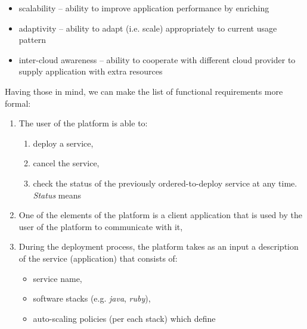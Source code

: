 \begin{itemize}
	\item scalability           -- ability to improve application performance by enriching
	\item adaptivity            -- ability to adapt (i.e. scale) appropriately to current usage pattern
	\item inter-cloud awareness -- ability to cooperate with different cloud provider to supply application with extra resources
\end{itemize}
Having those in mind, we can make the list of functional requirements more formal:
\begin{enumerate}
  \item The user of the platform is able to:
    \begin{enumerate}
      \item deploy a service,
      \item cancel the service,
      \item check the status of the previously ordered-to-deploy service at any time. \emph{Status} means 
    \end{enumerate}
  \item One of the elements of the platform is a client application that is used by the user of the platform to communicate with it,
  \item During the deployment process, the platform takes as an input a description of the service (application) that consists of:
    \begin{itemize}
    \item service name,
    \item software stacks (e.g. \emph{java}, \emph{ruby}),
    \item auto-scaling policies (per each stack) which define
\end{itemize}
\end{enumerate}
